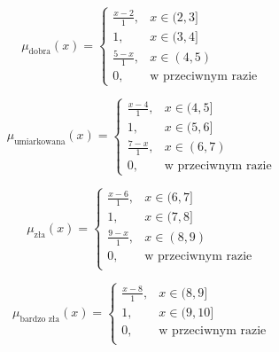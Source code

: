 \documentclass{article}
\begin{document}
\begin{enumerate}
\begin{equation}
\mu_{\text{dobra}}(x) =
\begin{cases}
\frac{x - 2}{1}, & x \in (2, 3] \\
1, & x \in (3, 4] \\
\frac{5 - x}{1}, & x \in (4, 5) \\
0, & \text{w przeciwnym razie}
\end{cases}
\end{equation}

\begin{equation}
\mu_{\text{umiarkowana}}(x) =
\begin{cases}
\frac{x - 4}{1}, & x \in (4, 5] \\
1, & x \in (5, 6] \\
\frac{7 - x}{1}, & x \in (6, 7) \\
0, & \text{w przeciwnym razie}
\end{cases}
\end{equation}  

                \begin{equation}
                    \mu_{\text{zła}}(x) =
                    \begin{cases}
                    \frac{x - 6}{1}, & x \in (6, 7] \\
                    1, & x \in (7, 8] \\
                    \frac{9 - x}{1}, & x \in (8, 9)\\
                    0, & \text{w przeciwnym razie} \\
                    \end{cases}
                \end{equation}

                \begin{equation}
                    \mu_{\text{bardzo zła}}(x) =
                    \begin{cases}
                    \frac{x - 8}{1}, &  x \in (8, 9] \\
                    1, & x \in (9, 10] \\
                    0, & \text{w przeciwnym razie} \\
                    \end{cases}
                \end{equation}


\end{enumerate}
\end{document}
